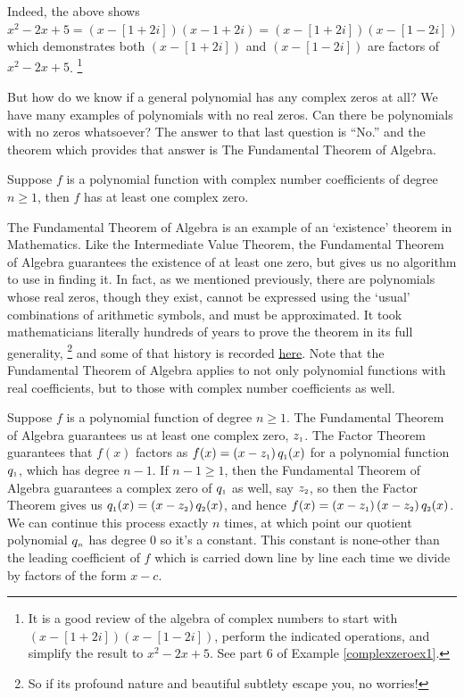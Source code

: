 \documentclass{ximera}
\begin{document}
Indeed, the above shows $x^2-2x+5  = (x-[1+2i])(x-1+2i)= (x-[1+2i])(x-[1-2i])$ which demonstrates both  $(x-[1+2i])$ and  $(x-[1-2i])$ are factors of $x^2-2x+5$.%
\footnote{
    It is a good review of the algebra of complex numbers to start with  $(x-[1+2i])(x-[1-2i])$, perform the indicated operations, and simplify the result to $x^2-2x+5$.  See part 6 of  Example \ref{complexzeroex1}.
    }%

But how do we know if a general polynomial has any complex zeros at all?  We have many examples of polynomials with no real zeros.  Can there be polynomials with no zeros whatsoever?  The answer to that last question is ``No.'' and the theorem which provides that answer is  The Fundamental Theorem of Algebra.

\begin{theorem}
    \label{ftoa}
    Suppose $f$ is a polynomial function with complex number coefficients of degree $n \geq 1$, then $f$ has at least one complex zero.
\end{theorem}

The Fundamental Theorem of Algebra is an example of an `existence' theorem in Mathematics.  Like the Intermediate Value Theorem, %
the Fundamental Theorem of Algebra  guarantees the existence of at least one zero, but gives us no algorithm to use in finding it.  In fact, as we mentioned previously, there are polynomials whose real zeros, though they exist, cannot be expressed using the `usual' combinations of arithmetic symbols, and must be approximated.  It took mathematicians literally hundreds of years to prove the theorem in its full generality,%
\footnote{So if its profound nature and beautiful subtlety escape you, no worries!} 
and some of that history is recorded \href{http://en.wikipedia.org/wiki/Fundamental_theorem_of_algebra}{\underline{here}}.  Note that the Fundamental Theorem of Algebra  applies to not only polynomial functions with real coefficients, but to those with complex number coefficients as well.  

Suppose  $f$ is a polynomial function of degree $n \geq 1$.  The Fundamental Theorem of Algebra guarantees us at least one complex zero, $z_{\mbox{\tiny $1$}}$.  The Factor Theorem guarantees that $f(x)$ factors as $f(x) = \left(x - z_{\mbox{\tiny $1$}}\right) q_{\mbox{\tiny $1$}}(x)$ for a polynomial function $q_{\mbox{\tiny $1$}}$,  which has degree $n-1$.  If $n-1 \geq 1$, then the Fundamental Theorem of Algebra guarantees a complex zero of $q_{\mbox{\tiny $1$}}$ as well, say $z_{\mbox{\tiny $2$}}$, so then the Factor Theorem gives us $q_{\mbox{\tiny $1$}}(x) = \left(x - z_{\mbox{\tiny $2$}}\right) q_{\mbox{\tiny $2$}}(x)$, and hence $f(x) = \left(x - z_{\mbox{\tiny $1$}}\right) \left(x - z_{\mbox{\tiny $2$}}\right) q_{\mbox{\tiny $2$}}(x)$.  We can continue this process exactly $n$ times, at which point our quotient polynomial $q_{\mbox{\tiny $n$}}$ has degree $0$ so it's a constant.  This constant is none-other than the leading coefficient of $f$ which is carried down line by line each time we divide by factors of the form $x-c$.
\end{document}
